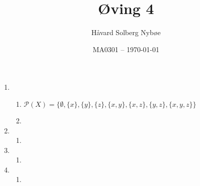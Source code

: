 \documentclass[a4paper, 12pt]{article}  %
\title{Øving 4}                         %
\author{Håvard Solberg Nybøe}           %
\date{MA0301 -- \today}                 %
\begin{document}
\maketitle

\begin{enumerate}
    \item [\boxed{1}]
    \begin{enumerate}
        \item $\mathcal{P}(X) = \{\emptyset, \{x\}, \{y\}, \{z\}, \{x, y\}, \{x, z\}, \{y, z\}, \{x, y, z\}\}$
        \item 
    \end{enumerate}
    \item [\boxed{2}]
    \begin{enumerate}
        \item 
    \end{enumerate}
    \item [\boxed{3}]
    \begin{enumerate}
        \item 
    \end{enumerate}
    \item [\boxed{4}]
    \begin{enumerate}
        \item 
    \end{enumerate}
\end{enumerate}

\end{document}
